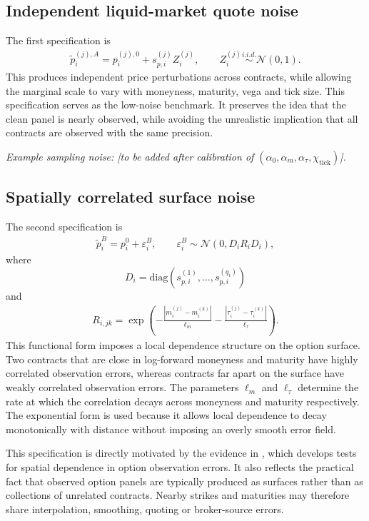 \documentclass[11pt,a4paper,notitlepage]{article}
\numberwithin{equation}{section}
\begin{document}
\subsection{Independent liquid-market quote noise}
The first specification is
\begin{align}
\tilde p_i^{(j),A}
=
p_i^{(j),0}+s_{p,i}^{(j)}Z_i^{(j)},
\qquad
Z_i^{(j)}\overset{i.i.d.}{\sim}\mathcal{N}(0,1).
\label{eq:app_liquid_noise}
\end{align}
This produces independent price perturbations across contracts, while allowing the marginal scale to vary with
moneyness, maturity, vega and tick size. This specification serves as the low-noise benchmark. It preserves the
idea that the clean panel is nearly observed, while avoiding the unrealistic implication that all contracts are
observed with the same precision.

\emph{Example sampling noise: [to be added after calibration of $(\alpha_0,\alpha_m,\alpha_\tau,\chi_{\mathrm{tick}})$].}

\subsection{Spatially correlated surface noise}
The second specification is
\begin{align}
\tilde p_i^B=p_i^0+\varepsilon_i^B,
\qquad
\varepsilon_i^B\sim\mathcal{N}(0,D_iR_iD_i),
\label{eq:app_spatial_noise}
\end{align}
where
\[
D_i=\mathrm{diag}\left(s_{p,i}^{(1)},\ldots,s_{p,i}^{(q_i)}\right)
\]
and
\begin{align}
R_{i,jk}
=
\exp\left(
-\frac{|m_i^{(j)}-m_i^{(k)}|}{\ell_m}
-\frac{|\tau_i^{(j)}-\tau_i^{(k)}|}{\ell_\tau}
\right).
\label{eq:app_spatial_kernel}
\end{align}
This functional form imposes a local dependence structure on the option surface. Two contracts that are close in
log-forward moneyness and maturity have highly correlated observation errors, whereas contracts far apart on the
surface have weakly correlated observation errors. The parameters $\ell_m$ and $\ell_\tau$ determine the rate at
which the correlation decays across moneyness and maturity respectively. The exponential form is used because it
allows local dependence to decay monotonically with distance without imposing an overly smooth error field.

This specification is directly motivated by the evidence in \citet{andersen2021spatial}, which develops tests for
spatial dependence in option observation errors. It also reflects the practical fact that observed option panels are
typically produced as surfaces rather than as collections of unrelated contracts. Nearby strikes and maturities may
therefore share interpolation, smoothing, quoting or broker-source errors.
\end{document}
